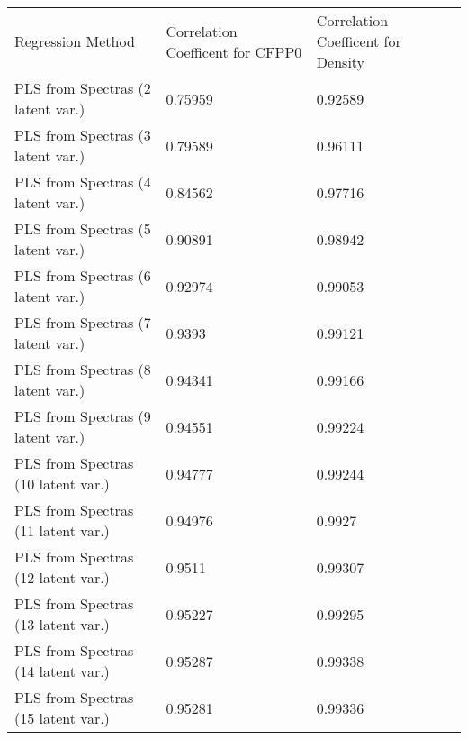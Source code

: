 \begin{table}[!hb]
	\centering
	\begin{tabular}{lll}
		Regression Method			& Correlation Coefficent for CFPP0	& Correlation Coefficent for Density\\
		PLS from Spectras (2 latent var.)	& 0.75959				& 0.92589\\
		PLS from Spectras (3 latent var.)	& 0.79589				& 0.96111\\
		PLS from Spectras (4 latent var.)	& 0.84562				& 0.97716\\
		PLS from Spectras (5 latent var.)	& 0.90891				& 0.98942\\
		PLS from Spectras (6 latent var.)	& 0.92974				& 0.99053\\
		PLS from Spectras (7 latent var.)	& 0.9393				& 0.99121\\
		PLS from Spectras (8 latent var.)	& 0.94341				& 0.99166\\
		PLS from Spectras (9 latent var.)	& 0.94551				& 0.99224\\
		PLS from Spectras (10 latent var.)	& 0.94777				& 0.99244\\
		PLS from Spectras (11 latent var.)	& 0.94976				& 0.9927\\
		PLS from Spectras (12 latent var.)	& 0.9511				& 0.99307\\
		PLS from Spectras (13 latent var.)	& 0.95227				& 0.99295\\
		PLS from Spectras (14 latent var.)	& 0.95287				& 0.99338\\
		PLS from Spectras (15 latent var.)	& 0.95281				& 0.99336\\
	\end{tabular}
\end{table}

